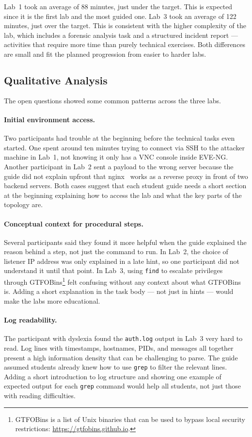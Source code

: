 Lab~1 took an average of 88 minutes, just under the target. This is
expected since it is the first lab and the most guided one. Lab~3 took an
average of 122 minutes, just over the target. This is consistent with the higher complexity of the lab, which includes
a forensic analysis task and a structured incident report --- activities
that require more time than purely technical exercises. Both differences are small and fit
the planned progression from easier to harder labs.

\subsection{Qualitative Analysis}

The open questions showed some common patterns across the three labs.

\paragraph{Initial environment access.}
Two participants had trouble at the beginning before the technical tasks even
started. One spent around ten minutes trying to connect via SSH to the
attacker machine in Lab~1, not knowing it only has a VNC console inside
EVE-NG. Another participant in Lab~2 sent a payload to the wrong server
because the guide did not explain upfront that nginx~\cite{nginx} works as a reverse proxy
in front of two backend servers. Both cases suggest that each student guide
needs a short section at the beginning explaining how to access the lab and
what the key parts of the topology are.

\paragraph{Conceptual context for procedural steps.}
Several participants said they found it more helpful when the guide explained
the reason behind a step, not just the command to run. In Lab~2, the choice
of listener IP address was only explained in a late hint, so one participant
did not understand it until that point. In Lab~3, using \texttt{find} to
escalate privileges through GTFOBins\footnote{GTFOBins is a list of Unix
binaries that can be used to bypass local security restrictions:
\url{https://gtfobins.github.io}.} felt confusing without any context about
what GTFOBins is. Adding a short explanation in the task body --- not just
in hints --- would make the labs more educational.

\paragraph{Log readability.}
The participant with dyslexia found the \texttt{auth.log} output in Lab~3
very hard to read. Log lines with timestamps, hostnames, PIDs, and messages
all together present a high information density that can be challenging to parse. The guide assumed students
already knew how to use \texttt{grep} to filter the relevant lines. Adding
a short introduction to log structure and showing one example of expected
output for each \texttt{grep} command would help all students, not just
those with reading difficulties.

